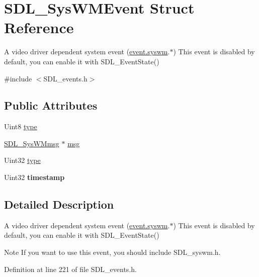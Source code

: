 \hypertarget{structSDL__SysWMEvent}{\section{S\+D\+L\+\_\+\+Sys\+W\+M\+Event Struct Reference}
\label{structSDL__SysWMEvent}
}


A video driver dependent system event (\hyperlink{unionSDL__Event_ab3b2eaf5348d4c50a51b1f297fdef537}{event.\+syswm}.$\ast$) This event is disabled by default, you can enable it with S\+D\+L\+\_\+\+Event\+State()  




{\ttfamily \#include $<$S\+D\+L\+\_\+events.\+h$>$}

\subsection*{Public Attributes}
\begin{DoxyCompactItemize}
\item 
Uint8 \hyperlink{structSDL__SysWMEvent_a84697e96cb16bf6a570e10b5bfdcd392}{type}
\item 
\hyperlink{structSDL__SysWMmsg}{S\+D\+L\+\_\+\+Sys\+W\+Mmsg} $\ast$ \hyperlink{structSDL__SysWMEvent_a90250ea9b87c21044da19adeadb5c847}{msg}
\item 
Uint32 \hyperlink{structSDL__SysWMEvent_a84697e96cb16bf6a570e10b5bfdcd392}{type}
\item 
\hypertarget{structSDL__SysWMEvent_a5d3cb97006d99b620c2671c27bd82c06}{Uint32 {\bfseries timestamp}}\label{structSDL__SysWMEvent_a5d3cb97006d99b620c2671c27bd82c06}

\end{DoxyCompactItemize}


\subsection{Detailed Description}
A video driver dependent system event (\hyperlink{unionSDL__Event_ab3b2eaf5348d4c50a51b1f297fdef537}{event.\+syswm}.$\ast$) This event is disabled by default, you can enable it with S\+D\+L\+\_\+\+Event\+State() 

\begin{DoxyNote}{Note}
If you want to use this event, you should include S\+D\+L\+\_\+syswm.\+h. 
\end{DoxyNote}


Definition at line 221 of file S\+D\+L\+\_\+events.\+h.



